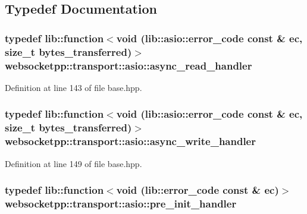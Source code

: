 \subsection{Typedef Documentation}
\hypertarget{namespacewebsocketpp_1_1transport_1_1asio_ac221bb77099f7ba684d4c39545d01116}{}
\subsubsection[{async\+\_\+read\+\_\+handler}]{\setlength{\rightskip}{0pt plus 5cm}typedef lib\+::function$<$void (lib\+::asio\+::error\+\_\+code const \& ec, size\+\_\+t bytes\+\_\+transferred)$>$ {\bf websocketpp\+::transport\+::asio\+::async\+\_\+read\+\_\+handler}}\label{namespacewebsocketpp_1_1transport_1_1asio_ac221bb77099f7ba684d4c39545d01116}


Definition at line 143 of file base.\+hpp.

\hypertarget{namespacewebsocketpp_1_1transport_1_1asio_a989b4423e174cb815d9ea9f87910b287}{}
\subsubsection[{async\+\_\+write\+\_\+handler}]{\setlength{\rightskip}{0pt plus 5cm}typedef lib\+::function$<$void (lib\+::asio\+::error\+\_\+code const \& ec, size\+\_\+t bytes\+\_\+transferred)$>$ {\bf websocketpp\+::transport\+::asio\+::async\+\_\+write\+\_\+handler}}\label{namespacewebsocketpp_1_1transport_1_1asio_a989b4423e174cb815d9ea9f87910b287}


Definition at line 149 of file base.\+hpp.

\hypertarget{namespacewebsocketpp_1_1transport_1_1asio_ad084554aff8b16e5c5d9a51ef82939cf}{}
\subsubsection[{pre\+\_\+init\+\_\+handler}]{\setlength{\rightskip}{0pt plus 5cm}typedef lib\+::function$<$void (lib\+::error\+\_\+code const \& ec)$>$ {\bf websocketpp\+::transport\+::asio\+::pre\+\_\+init\+\_\+handler}}\label{namespacewebsocketpp_1_1transport_1_1asio_ad084554aff8b16e5c5d9a51ef82939cf}


